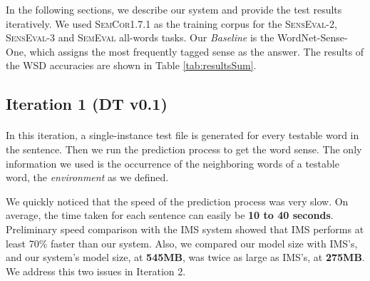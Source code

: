 \documentclass[a4paper,12pt]{nurop}
\begin{document}
In the following sections, we describe our system and provide the test results iteratively. We used \textsc{SemCor1.7.1} as the training corpus for the \textsc{SensEval-2}, \textsc{SensEval-3} and \textsc{SemEval} all-words tasks. Our \textit{Baseline} is the WordNet-Sense-One, which assigns the most frequently tagged sense as the answer. The results of the WSD accuracies are shown in Table \ref{tab:resultsSum}.

\subsection{Iteration 1 (DT v0.1)}
\label{it:1}
\paragraph{}



In this iteration, a single-instance test file is generated for every testable word in the sentence. Then we run the prediction process to get the word sense. The only information we used is the occurrence of the neighboring words of a testable word, the \textit{environment} as we defined.

We quickly noticed that the speed of the prediction process was very slow. On average, the time taken for each sentence can easily be \textbf{10 to 40 seconds}. Preliminary speed comparison with the IMS system showed that IMS performs at least 70\% faster than our system. Also, we compared our model size with IMS's, and our system's model size, at \textbf{545MB}, was twice as large as IMS's, at \textbf{275MB}. We address this two issues in Iteration 2.
\end{document}
